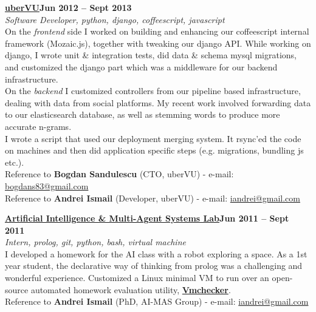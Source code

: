 \documentclass[margin,line]{resume}
\begin{document}
\begin{resume}
	\vspace{1.2mm}\href{http://www.ubervu.com}{\textbf{uberVU}}\hfill \textbf{Jun 2012 -- Sept 2013}\vspace{1.2mm}\\
	\vspace{1mm} \textsl{Software Developer, python, django, coffeescript, javascript}\vspace{1.5mm}\\
	On the \textit{frontend} side I worked on building and enhancing our coffeescript internal framework (Mozaic.js), together with tweaking our django API. While working on django, I wrote unit \& integration tests, did data \& schema mysql migrations, and customized the django part which was a middleware for our backend infrastructure.\\
	On the \textit{backend} I customized controllers from our pipeline based infrastructure, dealing with data from social platforms. My recent work involved forwarding data to our elasticsearch database, as well as stemming words to produce more accurate n-grams.\\
	I wrote a script that used our deployment merging system. It rsync'ed the code on machines and then did application specific steps (e.g. migrations, bundling js etc.).\vspace{1.5mm}\\
	\small{Reference to \textbf{Bogdan Sandulescu} (CTO, uberVU) - e-mail: \href{mailto:bogdans83@gmail.com}{bogdans83@gmail.com}}\\
	\small{Reference to \textbf{Andrei Ismail} (Developer, uberVU) - e-mail: \href{mailto:iandrei@gmail.com}{iandrei@gmail.com}}

	\vspace{1.2mm}\href{http://aimas.cs.pub.ro/}{\textbf{Artificial Intelligence \& Multi-Agent Systems Lab}}\hfill \textbf{Jun 2011 -- Sept 2011}\vspace{1.2mm}\\
	\vspace{1mm} \textsl{Intern, prolog, git, python, bash, virtual machine}\vspace{1.5mm}\\
	I developed a homework for the AI class with a robot exploring a space. As a 1st year student, the declarative way of thinking from prolog was a challenging and wonderful experience. Customized a Linux minimal VM to run over an open-source automated homework evaluation utility, \href{https://elf.cs.pub.ro/vmchecker/ui/?locale=en}{\textbf{Vmchecker}}.\vspace{1.5mm}\\
	\small{Reference to \textbf{Andrei Ismail} (PhD, AI-MAS Group) - e-mail: \href{mailto:iandrei@gmail.com}{iandrei@gmail.com}}


\end{resume}
\end{document}
